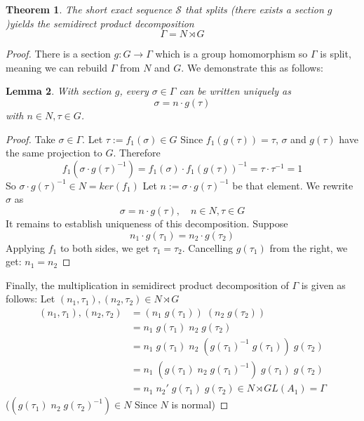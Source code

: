 \documentclass[12pt]{article}
\newtheorem{theorem}{Theorem}
\newtheorem{lemma}[theorem]{Lemma}
\numberwithin{theorem}{section}
\numberwithin{equation}{theorem}
\begin{document}
\begin{theorem}
    The short exact sequence $\mathcal{S}$ that splits (there exists a section $g$)yields the semidirect product decomposition $$\Gamma = N \rtimes G$$    
\end{theorem}
\begin{proof}
    There is a section $g : G \to \Gamma$ which is a group homomorphism so $\Gamma$ is split, meaning we can rebuild $\Gamma$ from $N$ and $G$. We demonstrate this as follows:

    \begin{lemma}
        With section $g$, every $\sigma \in \Gamma$ can be written uniquely as $$\sigma = n \cdot g(\tau)$$
        with $n \in N, \tau \in G$.
    \end{lemma}
    \begin{proof}
        Take $\sigma \in \Gamma$. Let $\tau := f_1(\sigma) \in G$
        Since $f_1(g(\tau)) = \tau$,\hspace{1ex} $\sigma$ and $g(\tau)$ have the same projection to $G$. Therefore 
        $$
        f_1(\sigma \cdot g(\tau)^{-1}) = f_1(\sigma) \cdot f_1(g(\tau))^{-1} = \tau \cdot \tau^{-1} = 1 
        $$ 
        So $\sigma \cdot g(\tau)^{-1} \in N = ker(f_1)$ Let $n := \sigma \cdot g(\tau)^{-1} $ be that element. We rewrite $\sigma$ as $$\sigma = n \cdot g(\tau), \quad n \in N, \tau \in G$$
        It remains to establish uniqueness of this decomposition. Suppose $$n_1 \cdot g(\tau_1) = n_2 \cdot g(\tau_2)$$
        Applying $f_1$ to both sides, we get $\tau_1 = \tau_2$.
        Cancelling $g(\tau_1)$ from the right, we get: $n_1 = n_2$
    \end{proof}
    
    Finally, the multiplication in semidirect product decomposition of $\Gamma$ is given as follows:
    Let $(n_1, \tau_1), (n_2, \tau_2) \in N \rtimes G$
    \begin{align*}
        (n_1, \tau_1), (n_2, \tau_2) 
        &= (n_1 \;g(\tau_1)) \;(n_2 \;g(\tau_2)) \\
        &= n_1 \;g(\tau_1) \;n_2 \;g(\tau_2) \\
        &= n_1 \;g(\tau_1) \;n_2 \;(g(\tau_1)^{-1} \;g(\tau_1)) \;g(\tau_2) \\
        &= n_1 \;(g(\tau_1) \;n_2 \;g(\tau_1)^{-1}) \;g(\tau_1) \;g(\tau_2)  \\
        &= n_1 \;n_2' \;g(\tau_1) \;g(\tau_2) \in N \rtimes GL(A_1) = \Gamma
    \end{align*}
    ($(g(\tau_1) \;n_2 \;g(\tau_2)^{-1}) \in N$ Since $N$ is normal)
\end{proof}
\end{document}
